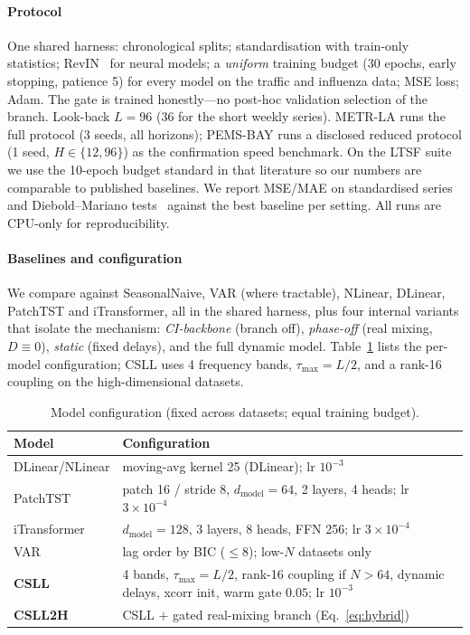 \documentclass[journal,a4paper]{IEEEtran}
\begin{document}
\paragraph{Protocol} One shared harness: chronological splits; standardisation with train-only
statistics; RevIN~\citep{kim2022revin} for neural models; a \emph{uniform} training budget (30
epochs, early stopping, patience 5) for every model on the traffic and influenza data; MSE loss;
Adam. The gate is trained honestly---no post-hoc validation selection of the branch. Look-back
$L{=}96$ ($36$ for the short weekly series). METR-LA runs the full protocol (3 seeds, all
horizons); PEMS-BAY runs a disclosed reduced protocol (1 seed, $H\in\{12,96\}$) as the confirmation
speed benchmark. On the LTSF suite we use the 10-epoch budget standard in that literature so our
numbers are comparable to published baselines. We report MSE/MAE on standardised series and
Diebold--Mariano tests~\citep{diebold1995comparing} against the best baseline per setting. All runs
are CPU-only for reproducibility.

\paragraph{Baselines and configuration} We compare against SeasonalNaive, VAR (where tractable),
NLinear, DLinear, PatchTST and iTransformer, all in the shared harness, plus four internal
variants that isolate the mechanism: \emph{CI-backbone} (branch off), \emph{phase-off} (real
mixing, $D{\equiv}0$), \emph{static} (fixed delays), and the full dynamic model.
Table~\ref{tab:hp} lists the per-model configuration; CSLL uses 4 frequency bands,
$\tau_{\max}{=}L/2$, and a rank-16 coupling on the high-dimensional datasets.

\begin{table}[t]\centering\small
\caption{Model configuration (fixed across datasets; equal training budget).}
\label{tab:hp}
\begin{tabular}{@{}l p{}@{}}
\toprule
Model & Configuration \\
\midrule
DLinear/NLinear & moving-avg kernel 25 (DLinear); lr $10^{-3}$ \\
PatchTST & patch 16 / stride 8, $d_{\text{model}}{=}64$, 2 layers, 4 heads; lr $3{\times}10^{-4}$ \\
iTransformer & $d_{\text{model}}{=}128$, 3 layers, 8 heads, FFN 256; lr $3{\times}10^{-4}$ \\
VAR & lag order by BIC ($\le 8$); low-$N$ datasets only \\
\textbf{CSLL} & 4 bands, $\tau_{\max}{=}L/2$, rank-16 coupling if $N{>}64$, dynamic delays,
xcorr init, warm gate $0.05$; lr $10^{-3}$ \\
\textbf{CSLL2H} & CSLL $+$ gated real-mixing branch (Eq.~\ref{eq:hybrid}) \\
\bottomrule
\end{tabular}
\end{table}
\end{document}
